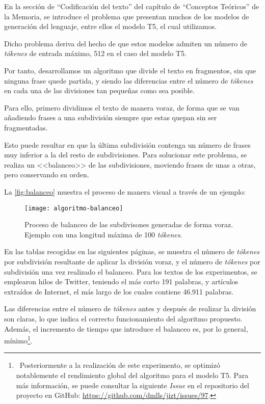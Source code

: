 
En la sección de ``Codificación del texto'' del capítulo de ``Conceptos Teóricos'' de la Memoria, se introduce el problema que presentan muchos de los modelos de generación del lenguaje, entre ellos el modelo T5, el cual utilizamos. 

Dicho problema deriva del hecho de que estos modelos admiten un número de \emph{tókenes} de entrada máximo, 512 en el caso del modelo T5.

Por tanto, desarrollamos un algoritmo que divide el texto en fragmentos, sin que ninguna frase quede partida, y siendo las diferencias entre el número de \emph{tókenes} en cada una de las divisiones tan pequeñas como sea posible.

Para ello, primero dividimos el texto de manera voraz, de forma que se van añadiendo frases a una subdivisión siempre que estas quepan sin ser fragmentadas. 

Esto puede resultar en que la última subdivisión contenga un número de frases muy inferior a la del resto de subdivisiones. Para solucionar este problema, se realiza un <<balanceo>> de las subdivisiones, moviendo frases de unas a otras, pero conservando su orden.

La \autoref{fig:balanceo} muestra el proceso de manera visual a través de un ejemplo:

\newpage

\begin{figure}[h!]
	\centering
	\texttt{[image: algoritmo-balanceo]}
	\vspace{-0.5cm}
	\caption{Proceso de balanceo de las subdivisones generadas de forma voraz. Ejemplo con una longitud máxima de 100 \emph{tókenes}.}
	\label{fig:balanceo}
\end{figure}

En las tablas recogidas en las siguientes páginas, se muestra el número de \emph{tókenes} por subdivisión resultante de aplicar la división voraz, y el número de \emph{tókenes} por subdivisión una vez realizado el balanceo. Para los textos de los experimentos, se emplearon hilos de Twitter, teniendo el más corto 191 palabras, y artículos extraídos de Internet, el más largo de los cuales contiene 46.911 palabras.

Las diferencias entre el número de \emph{tókenes} antes y después de realizar la división  son claras, lo que indica el correcto funcionamiento del algoritmo propuesto. Además, el incremento de tiempo que introduce el balanceo es, por lo general, mínimo\footnote{\, Posteriormente a la realización de este experimento, se optimizó notablemente el rendimiento global del algoritmo para el modelo T5. Para más información, se puede consultar la siguiente \emph{Issue} en el repositorio del proyecto en GitHub: \href{https://github.com/dmlls/jizt/issues/97}{https://github.com/dmlls/jizt/issues/97}.}.

